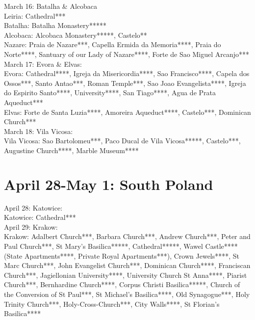 March 16: Batalha \& Alcobaca\\

Leiria: Cathedral***\\
Batalha: Batalha Monastery*****\\
Alcobaca: Alcobaca Monastery*****, Castelo**\\
Nazare: Praia de Nazare***, Capella Ermida da Memoria****, Praia do Norte****, Santuary of our Lady of Nazare****, Forte de Sao Miguel Arcanjo***\\

March 17: Evora \& Elvas:\\

Evora: Cathedral****, Igreja da Misericordia****, Sao Francisco****, Capela dos Ossos***, Santo Antao***, Roman Temple***, Sao Joao Evangelista****, Igreja do Espirito Santo****, University****, San Tiago****, Agua de Prata Aqueduct***\\
Elvas: Forte de Santa Luzia****, Amoreira Aqueduct****, Castelo***, Dominican Church***\\

March 18: Vila Vicosa:\\

Vila Vicosa: Sao Bartolomeu***, Paco Ducal de Vila Vicosa*****, Castelo***, Augustine Church****, Marble Museum****\\

\section{April 28-May 1: South Poland}
\label{2023:SouthPolands}

April 28: Katowice:\\

Katowice: Cathedral***\\

April 29: Krakow:\\

Krakow: Adalbert Church***, Barbara Church***, Andrew Church***, Peter and Paul Church***, St Mary's Basilica*****, Cathedral*****, Wawel Castle**** (State Apartments****, Private Royal Apartments***), Crown Jewels****, St Marc Church***,
John Evangelist Church***, Dominican Church****, Franciscan Church***, Jagiellonian University****, University Church St Anna****, Piarist Church***, Bernhardine Church****, Corpus Christi Basilica*****, Church of the Conversion of St Paul***,
St Michael's Basilica****, Old Synagogue***, Holy Trinity Church***, Holy-Cross-Church***, City Walls****, St Florian's Basilica****\\

